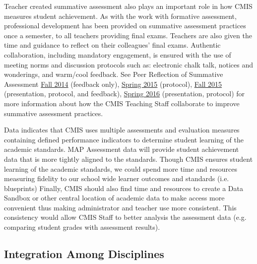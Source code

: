 \begin{findings}
Teacher created summative assessment also plays an important role in how CMIS measures student achievement. As with the work with formative assessment, professional development has been provided on summative assessment practices once a semester, to all teachers providing final exams. Teachers are also given the time and guidance to reflect on their colleagues’ final exams. Authentic collaboration, including mandatory engagement, is ensured with the use of meeting norms and discussion protocols such as: electronic chalk talk, notices and wonderings, and warm/cool feedback. See Peer Reflection of Summative Assessment \href{https://drive.google.com/a/cmis.ac.th/folderview?id=0ByVFfrm0zfolTHY0dmtURG5pcGs&usp=sharing}{Fall 2014} (feedback only), \href{https://drive.google.com/a/cmis.ac.th/folderview?id=0ByVFfrm0zfolaWQzeWxCTlVyUFU&usp=sharing}{Spring 2015} (protocol), \href{https://drive.google.com/a/cmis.ac.th/folderview?id=0ByVFfrm0zfolRjQzTDhmT0dyYzg&usp=sharing}{Fall 2015} (presentation, protocol, and feedback), \href{https://drive.google.com/a/cmis.ac.th/folderview?id=0ByVFfrm0zfolT29vQXpQeXp3VlU&usp=sharing}{Spring 2016} (presentation, protocol) for more information about how the CMIS Teaching Staff collaborate to improve summative assessment practices. 


Data indicates that CMIS uses multiple assessments and evaluation measures containing defined performance indicators to determine student learning of the academic standards. MAP Assessment data will provide student achievement data that is more tightly aligned to the standards. Though CMIS ensures student learning of the academic standards, we could spend more time and resources measuring fidelity to our school wide learner outcomes and standards (i.e. blueprints) Finally, CMIS should also find time and resources to create a Data Sandbox or other central location of academic data to make access more convenient thus making administrator and teacher use more consistent. This consistency would allow CMIS Staff to better analysis the assessment data (e.g. comparing student grades with assessment results). 
\end{findings}

\subsection{Integration Among Disciplines}


